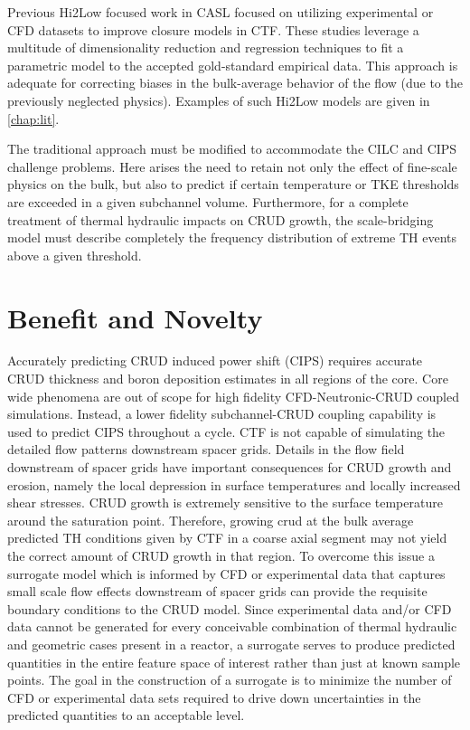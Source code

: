 Previous Hi2Low focused work in CASL focused on utilizing experimental or CFD
datasets to improve closure models in CTF.  These studies leverage a multitude
of dimensionality reduction and regression techniques to fit a parametric model
to the accepted gold-standard empirical data.  This approach is adequate for
correcting biases in the bulk-average behavior of the flow (due to the
previously neglected physics).  Examples of such Hi2Low models are given in
\autoref{chap:lit}.

The traditional approach must be modified to accommodate the CILC and CIPS
challenge problems.  Here arises the need to retain not only the effect of
fine-scale physics on the bulk, but also to predict if certain temperature or
TKE thresholds are exceeded in a given subchannel volume.  Furthermore, for a
complete treatment of thermal hydraulic impacts on CRUD growth, the
scale-bridging model must describe completely the frequency distribution of
extreme TH events above a given threshold.


\section{Benefit and Novelty}

Accurately predicting CRUD induced power shift (CIPS) requires accurate CRUD
thickness and boron deposition estimates in all regions of the core.  Core wide
phenomena are out of scope for high fidelity CFD-Neutronic-CRUD coupled
simulations.  Instead, a lower fidelity subchannel-CRUD coupling capability is used to
predict CIPS throughout a cycle.  CTF is not capable of simulating the detailed
flow patterns downstream spacer grids.  Details in the flow field
downstream of spacer grids have important consequences for CRUD growth and
erosion, namely the local depression in surface temperatures and locally
increased shear stresses.  CRUD growth is extremely sensitive to the surface
temperature around the saturation point.  Therefore, growing crud at the bulk
average predicted TH conditions given by CTF in a coarse axial segment may not
yield the correct amount of CRUD growth in that region.  To overcome this issue
a surrogate model which is informed by CFD or experimental data that captures
small scale flow effects downstream of spacer grids can provide the requisite
boundary conditions to the CRUD model.  Since experimental data and/or CFD data
cannot be generated for every conceivable combination of thermal hydraulic and
geometric cases present in a reactor, a surrogate serves to produce predicted
quantities in the entire feature space of interest rather than just at known
sample points.  The goal in the construction of a surrogate is to minimize the
number of CFD or experimental data sets required to drive down uncertainties in
the predicted quantities to an acceptable level.

